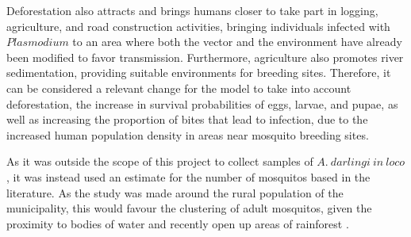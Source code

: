 \documentclass[a4paper,fleqn]{cas-dc}
\begin{document}
Deforestation also attracts and brings humans closer 
to take part in logging, agriculture, and road construction 
activities, bringing individuals infected with $Plasmodium$ to 
an area where both the vector and the environment have already 
been modified to favor transmission. Furthermore, agriculture 
also promotes river sedimentation, providing suitable environments 
for breeding sites. Therefore, it can be considered a relevant 
change for the model to take into account deforestation, the 
increase in survival probabilities of eggs, larvae, and pupae, 
as well as increasing the proportion of bites that lead to infection, 
due to the increased human population density in areas near mosquito 
breeding sites.

As it was outside the scope of this project to collect samples of $A. \ darlingi \ in \ loco$, it was instead used 
an estimate for the number of mosquitos based in the literature. As the study was made around the rural population of the municipality,
this would favour the clustering of adult mosquitos, given the proximity to bodies of water and recently open up areas of rainforest \cite{Biological_Variation_Anopheles}.
\end{document}

